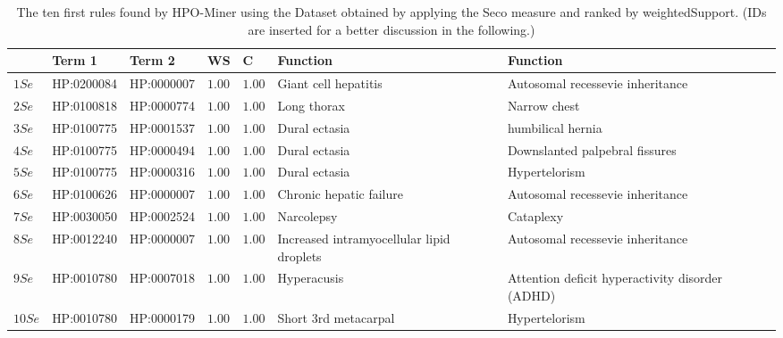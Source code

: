 \documentclass{article}
\theoremstyle{definition}
\begin{document}
\begin{table}[ht]

\caption{The ten first rules found by HPO-Miner using the Dataset obtained by applying the Seco measure and ranked by weightedSupport. (IDs are inserted for a better discussion in the following.) }
\label{tab:Seco}
\begin{tabular}{|p{0.55cm}|l|l|p{0.5cm}|p{0.5cm}|p{2.0cm}|p{2.0cm}|}
\hline 
\textbf{}&\textbf{Term 1}& \textbf{Term 2} & \textbf{WS} & \textbf{C} &\textbf{Function} & \textbf{Function }\\ 
\hline
$	1Se	$&	HP:0200084	&	HP:0000007	&$	1	.00$&$	1	.00$&	Giant cell hepatitis	&	Autosomal recessevie inheritance\\ 
\hline
$	2Se	$&	HP:0100818	&	HP:0000774	&$	1	.00$&$	1	.00$&	Long thorax	&	Narrow chest\\ 
\hline
$	3Se	$&	HP:0100775	&	HP:0001537	&$	1	.00$&$	1	.00$&	Dural ectasia	&	humbilical hernia\\ 
\hline
$	4Se	$&	HP:0100775	&	HP:0000494	&$	1	.00$&$	1	.00$&	Dural ectasia	&	Downslanted palpebral fissures\\ 
\hline
$	5Se	$&	HP:0100775	&	HP:0000316	&$	1	.00$&$	1	.00$&	Dural ectasia	&	Hypertelorism\\ 
\hline
$	6Se	$&	HP:0100626	&	HP:0000007	&$	1	.00$&$	1	.00$&	Chronic hepatic failure	&	Autosomal recessevie inheritance\\ 
\hline
$	7Se	$&	HP:0030050	&	HP:0002524	&$	1	.00$&$	1	.00$&	Narcolepsy	&	Cataplexy\\ 
\hline
$	8Se	$&	HP:0012240	&	HP:0000007	&$	1	.00$&$	1	.00$&	Increased intramyocellular lipid droplets	&	Autosomal recessevie inheritance\\ 
\hline
$	9Se	$&	HP:0010780	&	HP:0007018	&$	1	.00$&$	1	.00$&	Hyperacusis	&	Attention deficit hyperactivity disorder (ADHD)\\ 
\hline
$	10Se	$&	HP:0010780	&	HP:0000179	&$	1	.00$&$	1	.00$&	Short 3rd metacarpal	&	Hypertelorism\\ 
\hline
\end{tabular}
\end{table}
\end{document}
